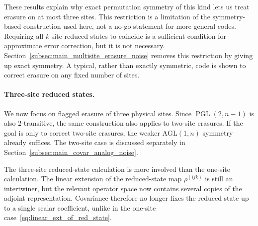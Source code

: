 \documentclass[10pt,twocolumn,superscriptaddress,aps,amsmath,amssymb,citeautoscript,floatfix,prx]{revtex4-2}
\theoremstyle{plain}
\theoremstyle{plain}
\theoremstyle{plain}
\theoremstyle{plain}
\theoremstyle{plain}
\theoremstyle{plain}
\theoremstyle{plain}
\theoremstyle{definition}
\theoremstyle{plain}
\begin{document}
These results explain why exact permutation symmetry of this kind lets us treat erasure on at most three sites. 
This restriction is a limitation of the symmetry-based construction used here, not a no-go statement for more general codes. 
Requiring all $k$-site reduced states to coincide is a sufficient condition for approximate error correction, but it is not necessary. 
Section~\ref{subsec:main_multisite_erasure_noise} removes this restriction by giving up exact symmetry. 
A typical, rather than exactly symmetric, code is shown to correct erasure on any fixed number of sites.

\paragraph{Three-site reduced states.}

We now focus on flagged erasure of three physical sites. Since $\operatorname{PGL}(2,n-1)$ is also $2$-transitive, the same construction also applies to two-site erasures. 
If the goal is only to correct two-site erasures, the weaker $\mathrm{AGL}(1,n)$ symmetry already suffices. 
The two-site case is discussed separately in Section~\ref{subsec:main_covar_analog_noise}.

The three-site reduced-state calculation is more involved than the one-site calculation. 
The linear extension of the reduced-state map $\rho^{(ijk)}$ is still an intertwiner, but the relevant operator space now contains several copies of the adjoint representation. 
Covariance therefore no longer fixes the reduced state up to a single scalar coefficient, unlike in the one-site case~\eqref{eq:linear_ext_of_red_state}.
\end{document}
